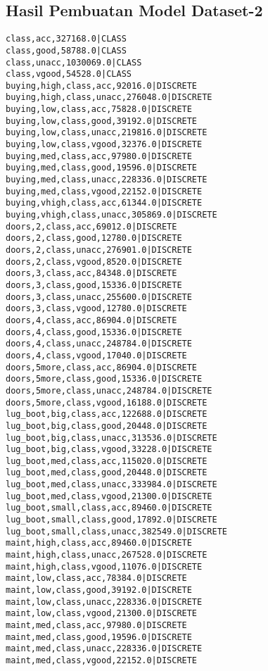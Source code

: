 \subsection{Hasil Pembuatan Model Dataset-2}
\label{lamp:E-Hasil Pembuatan Model Dataset-2}
\begin{lstlisting}
class,acc,327168.0|CLASS    
class,good,58788.0|CLASS    
class,unacc,1030069.0|CLASS    
class,vgood,54528.0|CLASS    
buying,high,class,acc,92016.0|DISCRETE    
buying,high,class,unacc,276048.0|DISCRETE    
buying,low,class,acc,75828.0|DISCRETE    
buying,low,class,good,39192.0|DISCRETE    
buying,low,class,unacc,219816.0|DISCRETE    
buying,low,class,vgood,32376.0|DISCRETE    
buying,med,class,acc,97980.0|DISCRETE    
buying,med,class,good,19596.0|DISCRETE    
buying,med,class,unacc,228336.0|DISCRETE    
buying,med,class,vgood,22152.0|DISCRETE    
buying,vhigh,class,acc,61344.0|DISCRETE    
buying,vhigh,class,unacc,305869.0|DISCRETE    
doors,2,class,acc,69012.0|DISCRETE    
doors,2,class,good,12780.0|DISCRETE    
doors,2,class,unacc,276901.0|DISCRETE    
doors,2,class,vgood,8520.0|DISCRETE    
doors,3,class,acc,84348.0|DISCRETE    
doors,3,class,good,15336.0|DISCRETE    
doors,3,class,unacc,255600.0|DISCRETE    
doors,3,class,vgood,12780.0|DISCRETE    
doors,4,class,acc,86904.0|DISCRETE    
doors,4,class,good,15336.0|DISCRETE    
doors,4,class,unacc,248784.0|DISCRETE    
doors,4,class,vgood,17040.0|DISCRETE    
doors,5more,class,acc,86904.0|DISCRETE    
doors,5more,class,good,15336.0|DISCRETE    
doors,5more,class,unacc,248784.0|DISCRETE    
doors,5more,class,vgood,16188.0|DISCRETE    
lug_boot,big,class,acc,122688.0|DISCRETE    
lug_boot,big,class,good,20448.0|DISCRETE    
lug_boot,big,class,unacc,313536.0|DISCRETE    
lug_boot,big,class,vgood,33228.0|DISCRETE    
lug_boot,med,class,acc,115020.0|DISCRETE    
lug_boot,med,class,good,20448.0|DISCRETE    
lug_boot,med,class,unacc,333984.0|DISCRETE    
lug_boot,med,class,vgood,21300.0|DISCRETE    
lug_boot,small,class,acc,89460.0|DISCRETE    
lug_boot,small,class,good,17892.0|DISCRETE    
lug_boot,small,class,unacc,382549.0|DISCRETE    
maint,high,class,acc,89460.0|DISCRETE    
maint,high,class,unacc,267528.0|DISCRETE    
maint,high,class,vgood,11076.0|DISCRETE    
maint,low,class,acc,78384.0|DISCRETE    
maint,low,class,good,39192.0|DISCRETE    
maint,low,class,unacc,228336.0|DISCRETE    
maint,low,class,vgood,21300.0|DISCRETE    
maint,med,class,acc,97980.0|DISCRETE    
maint,med,class,good,19596.0|DISCRETE    
maint,med,class,unacc,228336.0|DISCRETE    
maint,med,class,vgood,22152.0|DISCRETE    

\end{lstlisting}
